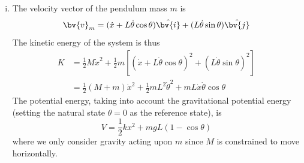 \begin{enumerate}[(i)]
\item { %
    The velocity vector of the pendulum mass $m$ is 
    \begin{equation}
        \bv{v}_m = ( \dot{x} + L \dot{\theta} \cos\theta ) \hat{\bv{i}} + (L \dot{\theta} \sin\theta ) \hat{\bv{j}}
    \end{equation}
    The kinetic energy of the system is thus 
    \begin{equation}
    \begin{aligned}
        K &= \frac{1}{2} M \dot{x}^2 + \frac{1}{2} m \left[ {\left( \dot{x} + L \dot{\theta} \cos\theta \right)}^2 + {\left( L \dot{\theta} \sin\theta \right)}^2 \right]  \\
        &= \frac{1}{2} (M + m) \dot{x}^2 + \frac{1}{2} m L^2 \dot{\theta}^2 + m L \dot{x} \dot{\theta} \cos\theta
    \end{aligned}
    \end{equation}
    The potential energy, taking into account the gravitational potential energy (setting the natural state $\theta = 0$ as the reference state), is 
    \begin{equation}
        V = \frac{1}{2} k x^2 + m g L (1 - \cos\theta)
    \end{equation}
    where we only consider gravity acting upon $m$ since $M$ is constrained to move horizontally. 

}
\end{enumerate}
